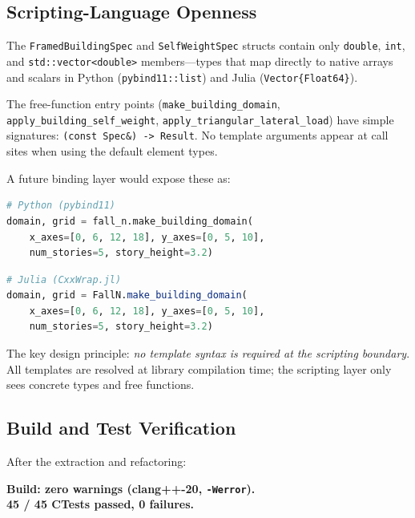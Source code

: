 \subsection{Scripting-Language Openness}
\label{sec:phase3-scripting}

The \texttt{FramedBuildingSpec} and \texttt{SelfWeightSpec} structs
contain only \texttt{double}, \texttt{int}, and
\texttt{std::vector<double>} members---types that map directly to
native arrays and scalars in Python (\texttt{pybind11::list}) and
Julia (\texttt{Vector\{Float64\}}).

The free-function entry points (\texttt{make\_building\_domain},
\texttt{apply\_building\_self\_weight},
\texttt{apply\_triangular\_lateral\_load}) have simple signatures:
\texttt{(const Spec\&) -> Result}.  No template arguments appear at
call sites when using the default element types.

A future binding layer would expose these as:
\begin{lstlisting}[language=Python,basicstyle=\small\ttfamily]
# Python (pybind11)
domain, grid = fall_n.make_building_domain(
    x_axes=[0, 6, 12, 18], y_axes=[0, 5, 10],
    num_stories=5, story_height=3.2)
\end{lstlisting}

\begin{lstlisting}[language=Julia,basicstyle=\small\ttfamily]
# Julia (CxxWrap.jl)
domain, grid = FallN.make_building_domain(
    x_axes=[0, 6, 12, 18], y_axes=[0, 5, 10],
    num_stories=5, story_height=3.2)
\end{lstlisting}

The key design principle: \emph{no template syntax is required at the
scripting boundary}.  All templates are resolved at library
compilation time; the scripting layer only sees concrete types and
free functions.

\subsection{Build and Test Verification}
\label{sec:phase3-verification}

After the extraction and refactoring:

\begin{center}
  \textbf{Build: zero warnings (clang++-20, \texttt{-Werror}).} \\[4pt]
  \textbf{45 / 45 CTests passed, 0 failures.}
\end{center}

